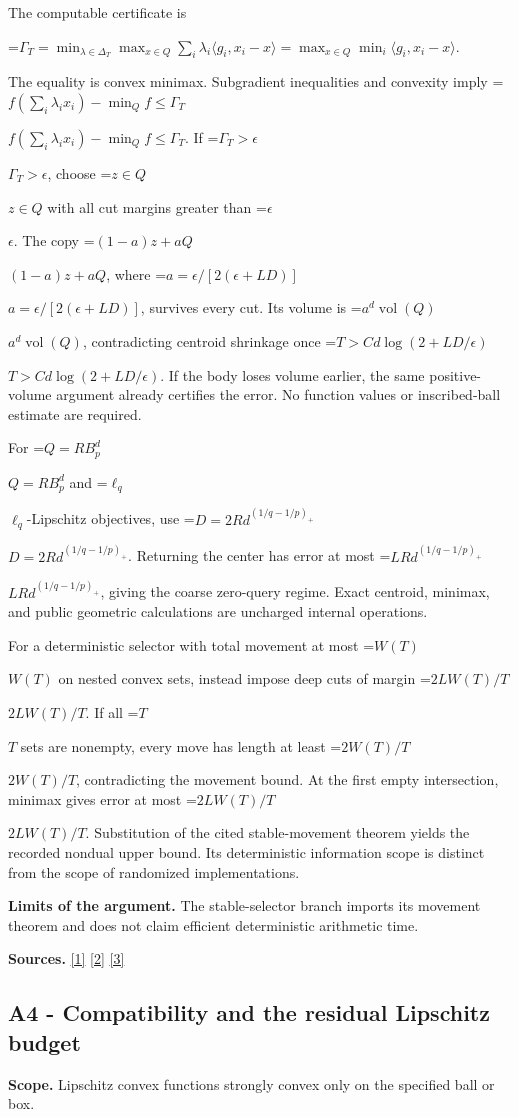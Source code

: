 \documentclass[10pt,a4paper]{article}
\newcommand{\AtlasMath}[1]{\par\begingroup\centering\setbox0=\hbox{$\displaystyle #1$}\ifdim\wd0>1.4\linewidth\typeout{ATLAS WIDE FORMULA: \the\wd0}\fi\ifdim\wd0>\linewidth\resizebox{\linewidth}{!}{\box0}\else\box0\fi\par\endgroup}
\newcommand{\AtlasInlineMath}[1]{\begingroup\setbox0=\hbox{$#1$}\ifdim\wd0>.4\linewidth\endgroup\AtlasMath{#1}\else\endgroup$#1$\fi}
\begin{document}
The computable certificate is

\AtlasMath{\Gamma_T=\min_{\lambda\in\Delta_T}\max_{x\in Q}\sum_i\lambda_i\langle g_i,x_i-x\rangle
=\max_{x\in Q}\min_i\langle g_i,x_i-x\rangle.}

The equality is convex minimax. Subgradient inequalities and convexity imply
\AtlasInlineMath{f(\sum_i\lambda_ix_i)-\min_Qf\le\Gamma_T}.
If \AtlasInlineMath{\Gamma_T>\epsilon}, choose \AtlasInlineMath{z\in Q} with all cut margins greater than \AtlasInlineMath{\epsilon}. The copy \AtlasInlineMath{(1-a)z+aQ}, where \AtlasInlineMath{a=\epsilon/[2(\epsilon+LD)]}, survives every cut. Its volume is \AtlasInlineMath{a^d\operatorname{vol}(Q)}, contradicting centroid shrinkage once \AtlasInlineMath{T>C d\log(2+LD/\epsilon)}. If the body loses volume earlier, the same positive-volume argument already certifies the error. No function values or inscribed-ball estimate are required.

For \AtlasInlineMath{Q=RB_p^d} and \AtlasInlineMath{\ell_q}-Lipschitz objectives, use \AtlasInlineMath{D=2Rd^{(1/q-1/p)_+}}. Returning the center has error at most \AtlasInlineMath{LRd^{(1/q-1/p)_+}}, giving the coarse zero-query regime. Exact centroid, minimax, and public geometric calculations are uncharged internal operations.

For a deterministic selector with total movement at most \AtlasInlineMath{W(T)} on nested convex sets, instead impose deep cuts of margin \AtlasInlineMath{2LW(T)/T}. If all \AtlasInlineMath{T} sets are nonempty, every move has length at least \AtlasInlineMath{2W(T)/T}, contradicting the movement bound. At the first empty intersection, minimax gives error at most \AtlasInlineMath{2LW(T)/T}. Substitution of the cited stable-movement theorem yields the recorded nondual upper bound. Its deterministic information scope is distinct from the scope of randomized implementations.

\textbf{Limits of the argument.} The stable-selector branch imports its movement theorem and does not claim efficient deterministic arithmetic time.

\textbf{Sources.} \href{https://arxiv.org/pdf/1405.4980}{[1]} \href{https://www2.isye.gatech.edu/~nemirovs/MOR_AccuracyCertificates.pdf}{[2]} \href{https://arxiv.org/pdf/2609.20701}{[3]}

\subsection{A4 - Compatibility and the residual Lipschitz budget}
\textbf{Scope.} Lipschitz convex functions strongly convex only on the specified ball or box.
\end{document}
